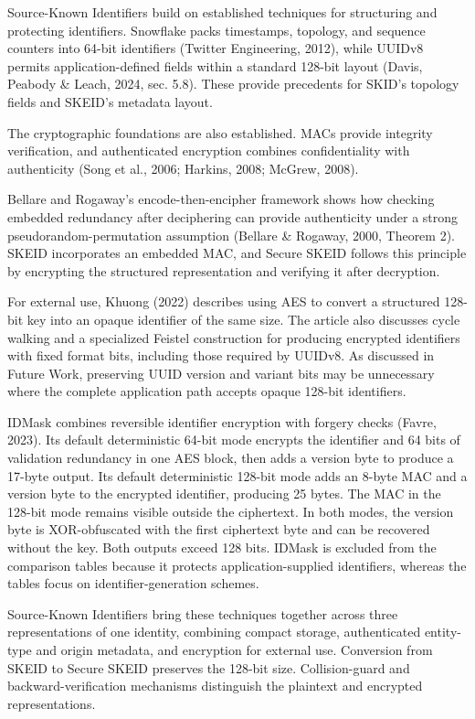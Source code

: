 \documentclass[fleqn,10pt]{wlpeerj}
\begin{document}
Source-Known Identifiers build on established techniques for structuring
and protecting identifiers. Snowflake packs timestamps, topology, and
sequence counters into 64-bit identifiers (Twitter Engineering, 2012),
while UUIDv8 permits application-defined fields within a standard
128-bit layout (Davis, Peabody \& Leach, 2024, sec. 5.8). These provide
precedents for SKID's topology fields and SKEID's metadata layout.

The cryptographic foundations are also established. MACs provide
integrity verification, and authenticated encryption combines
confidentiality with authenticity (Song et al., 2006; Harkins, 2008;
McGrew, 2008).

Bellare and Rogaway's encode-then-encipher framework shows how checking
embedded redundancy after deciphering can provide authenticity under a
strong pseudorandom-permutation assumption (Bellare \& Rogaway, 2000,
Theorem 2). SKEID incorporates an embedded MAC, and Secure SKEID follows
this principle by encrypting the structured representation and verifying
it after decryption.

For external use, Khuong (2022) describes using AES to convert a
structured 128-bit key into an opaque identifier of the same size. The
article also discusses cycle walking and a specialized Feistel
construction for producing encrypted identifiers with fixed format bits,
including those required by UUIDv8. As discussed in Future Work,
preserving UUID version and variant bits may be unnecessary where the
complete application path accepts opaque 128-bit identifiers.

IDMask combines reversible identifier encryption with forgery checks
(Favre, 2023). Its default deterministic 64-bit mode encrypts the
identifier and 64 bits of validation redundancy in one AES block, then
adds a version byte to produce a 17-byte output. Its default
deterministic 128-bit mode adds an 8-byte MAC and a version byte to the
encrypted identifier, producing 25 bytes. The MAC in the 128-bit mode
remains visible outside the ciphertext. In both modes, the version byte
is XOR-obfuscated with the first ciphertext byte and can be recovered
without the key. Both outputs exceed 128 bits. IDMask is excluded from
the comparison tables because it protects application-supplied
identifiers, whereas the tables focus on identifier-generation schemes.

Source-Known Identifiers bring these techniques together across three
representations of one identity, combining compact storage,
authenticated entity-type and origin metadata, and encryption for
external use. Conversion from SKEID to Secure SKEID preserves the
128-bit size. Collision-guard and backward-verification mechanisms
distinguish the plaintext and encrypted representations.
\end{document}
